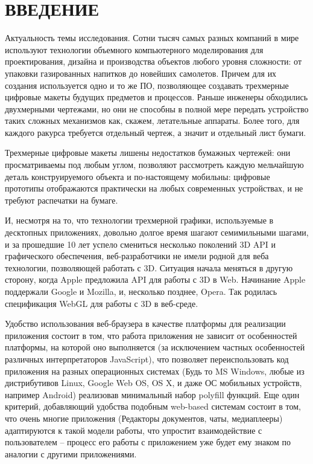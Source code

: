 \section{ВВЕДЕНИЕ}
\label{sec:intro}

Актуальность темы исследования. 
Сотни тысяч самых разных компаний в мире используют технологии объемного компьютерного моделирования для проектирования, дизайна и производства объектов любого уровня сложности: от упаковки 
газированных напитков до новейших самолетов. Причем для их создания используется одно и то же ПО, позволяющее создавать трехмерные цифровые макеты будущих предметов и процессов.
Раньше инженеры обходились двухмерными чертежами, но они не способны в полной мере передать устройство таких сложных механизмов как, скажем, летательные аппараты. Более того, для 
каждого ракурса требуется отдельный чертеж, а значит и отдельный лист бумаги.


Трехмерные цифровые макеты лишены недостатков бумажных чертежей: они просматриваемы под любым углом, позволяют рассмотреть каждую мельчайшую деталь конструируемого объекта и по-настоящему 
мобильны: цифровые прототипы отображаются практически на любых современных устройствах, и не требуют распечатки на бумаге. 

И, несмотря на то, что технологии трехмерной графики, используемые в десктопных приложениях, довольно долгое время шагают семимильными шагами, и за прошедшие 10 лет успело смениться 
несколько поколений 3D API и графического обеспечения, веб-разработчики не имели родной для веба технологии, позволяющей работать с 3D.
Ситуация начала меняться в другую сторону, когда Apple предложила API для работы с 3D в Web. Начинание Apple поддержали Google и Mozilla, и, несколько позднее, Opera. Так родилась 
спецификация WebGL для работы с 3D в веб-среде.

Удобство использования веб-браузера в качестве платформы для реализации приложения состоит в том, что работа приложения не зависит от особенностей платформы, на которой оно выполняется 
(за исключением частных особенностей различных интерпретаторов JavaScript), что позволяет переиспользовать код приложения на разных операционных системах (Будь то MS Windows, любые из 
дистрибутивов Linux, Google Web OS, OS X, и даже ОС мобильных устройств, например Android) реализовав минимальный набор polyfill функций. Еще один критерий, добавляющий удобства подобным 
web-based системам состоит в том, что очень многие приложения (Редакторы документов, чаты, медиаплееры) адаптируются к такой модели работы, что упростит взаимодействие с пользователем --
процесс его работы с приложением уже будет ему знаком по аналогии с другими приложениями. 
 
